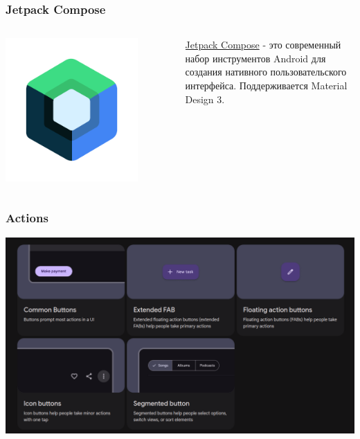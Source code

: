 \documentclass[12pt]{beamer}
\begin{document}
    \begin{frame}
        \frametitle{Jetpack Compose}

        \begin{columns}

            \begin{column}{0.5\textwidth}
                \includegraphics[width=0.8\textwidth]{jc.png}
            \end{column}

            \begin{column}{0.5\textwidth}
                \href{https://developer.android.com/compose}{Jetpack Compose}
                - это современный набор инструментов Android
                для создания нативного пользовательского интерфейса.
                Поддерживается Material Design 3.
            \end{column}

        \end{columns}

    \end{frame}

    \begin{frame}
        \frametitle{Actions}
    
        \includegraphics[width=1\textwidth]{actions.png}
    
    \end{frame}
\end{document}
